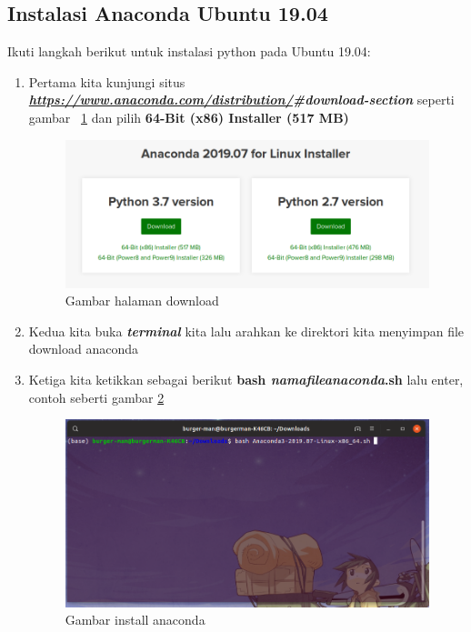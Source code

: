 \subsection{Instalasi Anaconda Ubuntu 19.04}
Ikuti langkah berikut untuk instalasi python pada Ubuntu 19.04:
\begin{enumerate}
\item Pertama kita kunjungi situs \\ \textbf{\textit{\small \url{https://www.anaconda.com/distribution/}\#download-section}} seperti gambar ~\ref{anacondadownload} dan pilih \textbf{64-Bit (x86) Installer (517 MB)}
\begin{figure}[H]
\centering
\includegraphics[width=1\textwidth]{figures/ubuntu/anacondadownload.png}
\caption{Gambar halaman download}
\label{anacondadownload}
\end{figure}

\item Kedua kita buka \textit{\textbf{terminal}} kita lalu arahkan ke direktori kita menyimpan file download anaconda

\item Ketiga kita ketikkan sebagai berikut \textbf{bash \textit{namafileanaconda}.sh} lalu enter, contoh seberti gambar \ref{anacondabash}
\begin{figure}[H]
\centering
\includegraphics[width=1\textwidth]{figures/ubuntu/anacondabash.png}
\caption{Gambar install anaconda}
\label{anacondabash}
\end{figure}


\end{enumerate}
